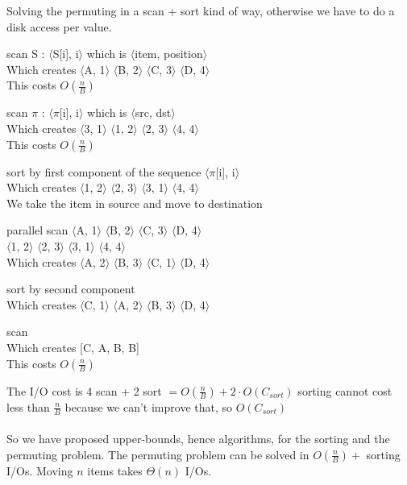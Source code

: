 \documentclass[10pt]{report}
\begin{document}
Solving the permuting in a scan + sort kind of way, otherwise we have to do a disk access per value.\\
\begin{list}{}{}
	\item scan S : $\langle$S[i], i$\rangle$ which is $\langle$item, position$\rangle$\\
	Which creates $\langle$A, 1$\rangle$ $\langle$B, 2$\rangle$ $\langle$C, 3$\rangle$ $\langle$D, 4$\rangle$\\
	This costs $O(\frac{n}{B})$
	\item scan $\pi$ : $\langle\pi$[i], i$\rangle$ which is $\langle$src, dst$\rangle$\\
	Which creates $\langle$3, 1$\rangle$ $\langle$1, 2$\rangle$ $\langle$2, 3$\rangle$ $\langle$4, 4$\rangle$\\
	This costs $O(\frac{n}{B})$
	\item sort by first component of the sequence $\langle\pi$[i], i$\rangle$\\
	Which creates $\langle$1, 2$\rangle$ $\langle$2, 3$\rangle$ $\langle$3, 1$\rangle$ $\langle$4, 4$\rangle$\\
	We take the item in source and move to destination
	\item parallel scan
	$\langle$A, 1$\rangle$ $\langle$B, 2$\rangle$ $\langle$C, 3$\rangle$ $\langle$D, 4$\rangle$\\
	$\langle$1, 2$\rangle$ $\langle$2, 3$\rangle$ $\langle$3, 1$\rangle$ $\langle$4, 4$\rangle$\\
	Which creates $\langle$A, 2$\rangle$ $\langle$B, 3$\rangle$ $\langle$C, 1$\rangle$ $\langle$D, 4$\rangle$\\
	\item sort by second component\\
	Which creates $\langle$C, 1$\rangle$ $\langle$A, 2$\rangle$ $\langle$B, 3$\rangle$ $\langle$D, 4$\rangle$\\
	\item scan\\
	Which creates [C, A, B, B]\\
	This costs $O(\frac{n}{B})$
\end{list}
The I/O cost is 4 scan + 2 sort $= O(\frac{n}{B}) + 2\cdot O(C_{sort})$ sorting cannot cost less than $\frac{n}{B}$ because we can't improve that, so $O(C_{sort})$\\\\
So we have proposed upper-bounds, hence algorithms, for the sorting and the permuting problem. The permuting problem can be solved in $O(\frac{n}{B}) +$ sorting I/Os. Moving $n$ items takes $\Theta(n)$ I/Os.\\
\end{document}
